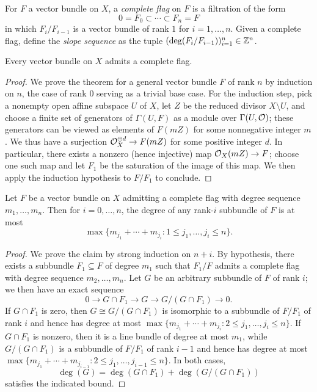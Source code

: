 \begin{definition} \label{def:complete flag}
For $F$ a vector bundle on $X$, a \emph{complete flag} on $F$ is a filtration of the form
\[
0 = F_0 \subset \cdots \subset F_n = F
\]
in which $F_i/F_{i-1}$ is a vector bundle of rank $1$ for $i=1,\dots,n$.
Given a complete flag, define the \emph{slope sequence} as the tuple $(\deg(F_i/F_{i-1}))_{i=1}^n \in \mathbb{Z}^n$.
\end{definition}

\begin{lemma} \label{lem:filtration by line bundles}
Every vector bundle on $X$ admits a complete flag.
\end{lemma}
\begin{proof}
We prove the theorem for a general vector bundle $F$ of rank $n$ by induction on $n$,
the case of rank 0 serving as a trivial base case.
For the induction step, pick a nonempty open affine subspace $U$ of $X$, let $Z$ be the reduced divisor $X \setminus U$, and choose a finite set of generators of $\Gamma(U, F)$ as a module over $\Gamma(U, \mathcal{O})$; these generators can be viewed as elements of $F(mZ)$ for some nonnegative integer $m$. We thus have a surjection $\mathcal{O}_X^{\oplus d} \to F(mZ)$ for some positive integer $d$. In particular, there exists a nonzero (hence injective) map $\mathcal{O}_X(mZ) \to F$;
choose one such map and let $F_1$ be the saturation of the image of this map. 
We then apply the induction hypothesis to $F/F_1$ to conclude.
\end{proof}

\begin{lemma} \label{lem:subbundle slope bound}
Let $F$ be a vector bundle on $X$ admitting a complete flag with degree sequence $m_1,\dots,m_n$.
Then for $i=0,\dots,n$, the degree of any rank-$i$ subbundle of $F$ is at most 
\[
\max\{m_{j_1} + \cdots + m_{j_i}\colon 1 \leq j_1,\dots,j_i \leq n\}.
\]
\end{lemma}
\begin{proof}
We prove the claim by strong induction on $n+i$.
By hypothesis, there exists a subbundle $F_1 \subseteq F$ of degree $m_1$
such that $F_1/F$ admits a complete flag with degree sequence $m_2,\dots,m_n$.
Let $G$ be an arbitrary subbundle of $F$ of rank $i$; we then have an exact sequence
\[
0 \to G \cap F_1 \to G \to G/(G \cap F_1) \to 0.
\]
If $G \cap F_1$ is zero,
then $G \cong G/(G \cap F_1)$ is isomorphic to a subbundle of $F/F_1$ of rank $i$
and hence has degree at most
$\max\{m_{j_1} + \cdots + m_{j_i}: 2 \leq j_1,\dots,j_i \leq n\}$.
If $G \cap F_1$ is nonzero, then it is a line bundle of degree at most $m_1$,
while $G/(G \cap F_1)$ is a subbundle of $F/F_1$ of rank $i-1$ and hence has degree at most
$\max\{m_{j_1} + \cdots + m_{j_{i-1}}\colon 2 \leq j_1,\dots,j_{i-1} \leq n\}$.
In both cases,
\[
\deg(G) = \deg(G \cap F_1) + \deg(G/(G \cap F_1))
\]
satisfies the indicated bound.
\end{proof}

